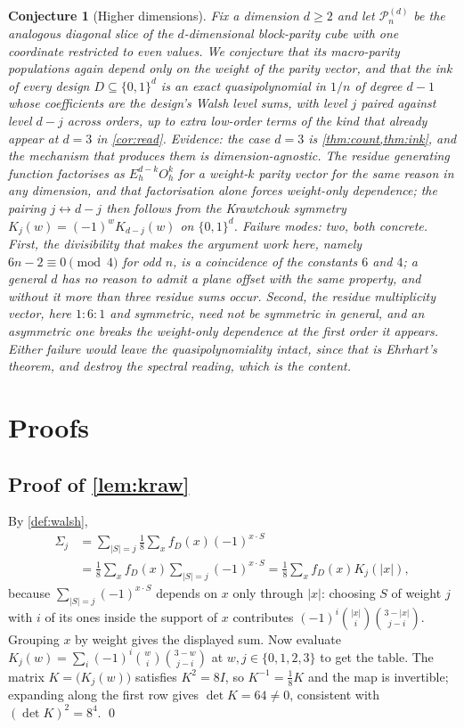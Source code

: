\documentclass[11pt]{amsart}
\newtheorem{conjecture}[theorem]{Conjecture}
\theoremstyle{definition}
\theoremstyle{remark}
\begin{document}
\begin{conjecture}[Higher dimensions]
\label{con:dim}
Fix a dimension $d \ge 2$ and let $\mathcal{P}^{(d)}_n$ be the analogous diagonal slice of the $d$-dimensional block-parity cube with one coordinate restricted to even values. We conjecture that its macro-parity populations again depend only on the weight of the parity vector, and that the ink of every design $D \subseteq \{0,1\}^d$ is an exact quasipolynomial in $1/n$ of degree $d-1$ whose coefficients are the design's Walsh level sums, with level $j$ paired against level $d-j$ across orders, up to extra low-order terms of the kind that already appear at $d=3$ in \cref{cor:read}.
\emph{Evidence:} the case $d=3$ is \cref{thm:count,thm:ink}, and the mechanism that produces them is dimension-agnostic. The residue generating function factorises as $E_h^{d-k} O_h^k$ for a weight-$k$ parity vector for the same reason in any dimension, and that factorisation alone forces weight-only dependence; the pairing $j \leftrightarrow d-j$ then follows from the Krawtchouk symmetry $K_j(w) = (-1)^w K_{d-j}(w)$ on $\{0,1\}^d$.
\emph{Failure modes:} two, both concrete. First, the divisibility that makes the argument work here, namely $6n-2 \equiv 0 \pmod 4$ for odd $n$, is a coincidence of the constants $6$ and $4$; a general $d$ has no reason to admit a plane offset with the same property, and without it more than three residue sums occur. Second, the residue multiplicity vector, here $1:6:1$ and symmetric, need not be symmetric in general, and an asymmetric one breaks the weight-only dependence at the first order it appears. Either failure would leave the quasipolynomiality intact, since that is Ehrhart's theorem, and destroy the spectral reading, which is the content.
\end{conjecture}

\section{Proofs}
\label{sec:proof}

\subsection*{Proof of \cref{lem:kraw}}

By \cref{def:walsh},
\[
\begin{aligned}
\Sigma_j &= \sum_{|S|=j} \tfrac18 \sum_{x} f_D(x) (-1)^{x \cdot S}\\
 &= \tfrac18 \sum_{x} f_D(x) \!\!\sum_{|S|=j}\!\! (-1)^{x \cdot S}
 = \tfrac18 \sum_{x} f_D(x) K_j(|x|),
\end{aligned}
\]
because $\sum_{|S|=j}(-1)^{x \cdot S}$ depends on $x$ only through $|x|$: choosing $S$ of weight $j$ with $i$ of its ones inside the support of $x$ contributes $(-1)^i \binom{|x|}{i}\binom{3-|x|}{j-i}$. Grouping $x$ by weight gives the displayed sum. Now evaluate $K_j(w) = \sum_i (-1)^i \binom{w}{i}\binom{3-w}{j-i}$ at $w,j \in \{0,1,2,3\}$ to get the table. The matrix $K = \bigl(K_j(w)\bigr)$ satisfies $K^2 = 8I$, so $K^{-1} = \tfrac18 K$ and the map is invertible; expanding along the first row gives $\det K = 64 \ne 0$, consistent with $(\det K)^2 = 8^4$. \qed
\end{document}

